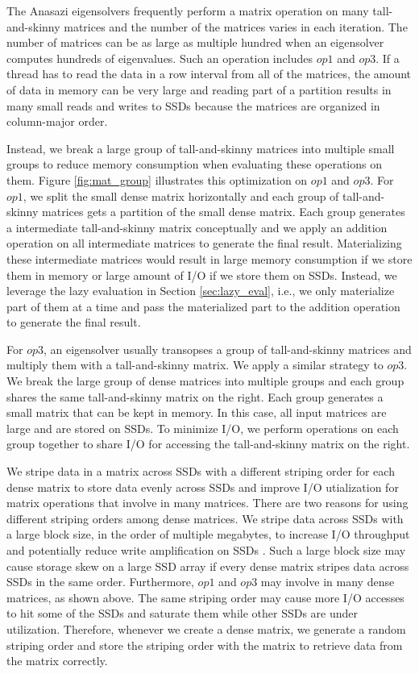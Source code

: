 The Anasazi eigensolvers frequently perform a matrix operation on many
tall-and-skinny matrices and the number of the matrices varies in each iteration.
The number of matrices can be as large as multiple hundred when an eigensolver
computes hundreds of eigenvalues.
Such an operation includes $op1$ and $op3$. If a thread has to read the data
in a row interval from all of the matrices, the amount of data in memory
can be very large and reading part of a partition results in many small reads
and writes to SSDs because the matrices are organized in column-major order.

Instead, we break a large group of tall-and-skinny matrices into multiple small
groups to reduce
memory consumption when evaluating these operations on them. Figure
\ref{fig:mat_group} illustrates this optimization on $op1$ and $op3$. For $op1$,
we split the small dense matrix horizontally and each group of tall-and-skinny
matrices gets a partition of the small dense matrix. Each group generates
a intermediate tall-and-skinny matrix conceptually and we apply an addition
operation on all intermediate matrices to generate the final result.
Materializing these
intermediate matrices would result in large memory consumption if we store them
in memory or large amount of I/O if we store them on SSDs. Instead, we leverage
the lazy evaluation in Section \ref{sec:lazy_eval}, i.e., we only materialize
part of them at a time and pass the materialized part to the addition operation
to generate the final result.

For $op3$, an eigensolver usually transopses a group of tall-and-skinny matrices
and multiply them with a tall-and-skinny matrix. We apply a similar strategy to
$op3$. We break the large group of dense matrices into multiple groups and each
group shares the same tall-and-skinny matrix on the right. Each group generates
a small matrix that can be kept in memory. In this case, all input matrices
are large and are stored on SSDs. To minimize I/O, we perform operations on
each group together to share I/O for accessing the tall-and-skinny matrix
on the right.

We stripe data in a matrix across SSDs with a different striping order for each
dense matrix
to store data evenly across SSDs and improve I/O utialization for matrix operations
that involve in many matrices. There are two reasons for using different striping
orders among dense matrices.
We stripe data across SSDs with a large block size, in the order of multiple
megabytes, to increase I/O throughput and potentially reduce write amplification
on SSDs \cite{}. Such a large block size may cause storage skew on a large SSD
array if every dense matrix stripes data across SSDs in the same order.
Furthermore, $op1$ and $op3$ may involve in many dense matrices, as shown above.
The same striping order may cause more I/O accesses to hit some of the SSDs
and saturate them while other SSDs are under utilization. Therefore,
whenever we create a dense matrix, we generate a random striping order and store
the striping order with the matrix to retrieve data from the matrix correctly.

